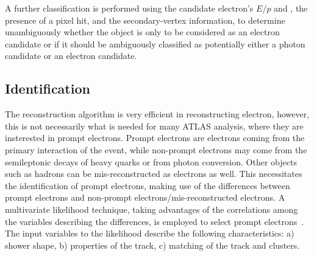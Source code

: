 A further classification is performed using the candidate electron’s $E/p$ and \pt, 
the presence of a pixel hit, and the secondary-vertex information, to determine
unambiguously whether the object is only to be considered as an electron candidate or if it should be
ambiguously classified as potentially either a photon candidate or an electron candidate.

\subsection{Identification} 
The reconstruction algorithm is very efficient in reconstructing electron,
however, this is not necessarily what is needed for many ATLAS analysis, where
they are insterested in prompt electrons. 
Prompt electrons are electrons coming from the 
primary interaction of the event, 
while non-prompt electrons may come from
the semileptonic decays of heavy quarks or from photon conversion.
Other objects such as hadrons can be 
mis-reconstructed as electrons as well.
This necessitates the identification of prompt electrons, 
making use of the differences between prompt electrons 
and non-prompt electrons/mis-reconstructed electrons.
A multivariate likelihood technique, taking advantages of the correlations
among the variables describing the differences,
is employed to select prompt electrons~\cite{PERF-2017-01}.
The input variables to the likelihood 
describe the following characteristics: 
a) shower shape, b) properties of the track, c) matching
of the track and clusters.

